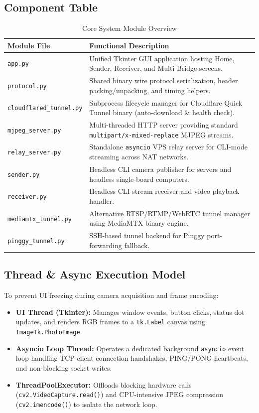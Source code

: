 \documentclass[11pt,a4paper]{article}
\begin{document}
\subsection{Component Table}
\begin{table}[H]
    \centering
    \begin{tabularx}{\textwidth}{@{}lX@{}}
        \toprule
        \textbf{Module File} & \textbf{Functional Description} \\
        \midrule
        \texttt{app.py} & Unified Tkinter GUI application hosting Home, Sender, Receiver, and Multi-Bridge screens. \\
        \texttt{protocol.py} & Shared binary wire protocol serialization, header packing/unpacking, and timing helpers. \\
        \texttt{cloudflared\_tunnel.py} & Subprocess lifecycle manager for Cloudflare Quick Tunnel binary (auto-download \& health check). \\
        \texttt{mjpeg\_server.py} & Multi-threaded HTTP server providing standard \texttt{multipart/x-mixed-replace} MJPEG streams. \\
        \texttt{relay\_server.py} & Standalone \texttt{asyncio} VPS relay server for CLI-mode streaming across NAT networks. \\
        \texttt{sender.py} & Headless CLI camera publisher for servers and headless single-board computers. \\
        \texttt{receiver.py} & Headless CLI stream receiver and video playback handler. \\
        \texttt{mediamtx\_tunnel.py} & Alternative RTSP/RTMP/WebRTC tunnel manager using MediaMTX binary engine. \\
        \texttt{pinggy\_tunnel.py} & SSH-based tunnel backend for Pinggy port-forwarding fallback. \\
        \bottomrule
    \end{tabularx}
    \caption{Core System Module Overview}
\end{table}

\subsection{Thread \& Async Execution Model}
To prevent UI freezing during camera acquisition and frame encoding:
\begin{itemize}[noitemsep]
    \item \textbf{UI Thread (Tkinter):} Manages window events, button clicks, status dot updates, and renders RGB frames to a \texttt{tk.Label} canvas using \texttt{ImageTk.PhotoImage}.
    \item \textbf{Asyncio Loop Thread:} Operates a dedicated background \texttt{asyncio} event loop handling TCP client connection handshakes, PING/PONG heartbeats, and non-blocking socket writes.
    \item \textbf{ThreadPoolExecutor:} Offloads blocking hardware calls (\texttt{cv2.VideoCapture.read()}) and CPU-intensive JPEG compression (\texttt{cv2.imencode()}) to isolate the network loop.
\end{itemize}
\end{document}
